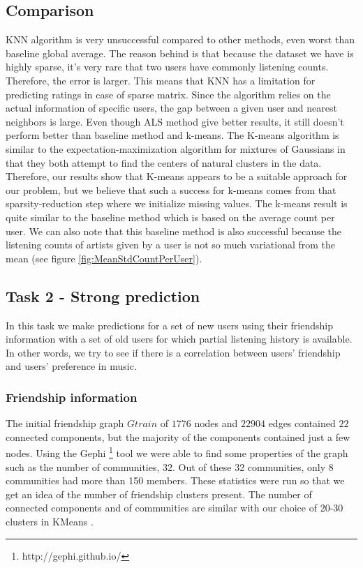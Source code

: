 \subsection{Comparison}

KNN algorithm is very unsuccessful compared to other methods, even worst than baseline global average. The reason behind is that because the dataset we have is highly sparse, it’s very rare that two users have commonly listening counts. Therefore, the error is larger. This means that KNN has a limitation for predicting ratings in case of sparse matrix. Since the algorithm relies on the actual information of specific users, the gap between a given user and nearest neighbors is large. Even though ALS method give better results, it still doesn't perform better than baseline method and k-means. The K-means algorithm is similar to the expectation-maximization algorithm for mixtures of Gaussians in that they both attempt to find the centers of natural clusters in the data. Therefore, our results show that K-means appears to be a suitable approach for our problem, but we believe that such a success for k-means comes from that sparsity-reduction step where we initialize missing values. The k-means result is quite similar to the baseline method which is based on the average count per user. We can also note that this baseline method is also successful because the listening counts of artists given by a user is not so much variational from the mean (see figure \ref{fig:MeanStdCountPerUser}).

\subsection{Task 2 - Strong prediction}
In this task we make predictions for a set of new users using their friendship information with a set of old users for which partial listening history is available. In other words, we try to see if there is a correlation between
users' friendship and users' preference in music.

\subsubsection{Friendship information}
The initial friendship graph $Gtrain$ of $1776$ nodes and $22904$ edges contained $22$ connected components, but the majority of the components contained just a few nodes.
Using the Gephi  \footnote{http://gephi.github.io/} tool we were able to find some properties of the graph such as the number of communities, 32.  Out of these 32 communities, only 8 communities had more than 150 members.
These statistics were run so that we get an idea of the number of friendship clusters present. The number of connected components and of communities are similar with our choice of 20-30 clusters in KMeans .

